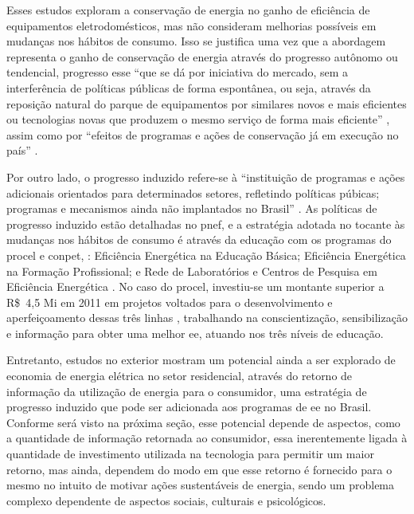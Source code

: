 Esses estudos exploram a conservação de energia no ganho de eficiência
de equipamentos eletrodomésticos, mas não consideram melhorias possíveis
em mudanças nos hábitos de consumo. Isso se justifica uma vez que a abordagem
representa o ganho de conservação de energia através do progresso autônomo
ou tendencial, progresso esse ``que se dá por iniciativa do mercado, sem a
interferência de políticas públicas de forma espontânea, ou seja, através da
reposição natural do parque de equipamentos por similares novos e mais
eficientes ou tecnologias novas que produzem o mesmo serviço de forma mais
eficiente'' \cite[pp. 1]{pnef}, assim como por ``efeitos de programas e ações de
conservação já em execução no país'' \cite[pp. 247]{pde_2020}.

Por outro lado, o progresso induzido refere-se à ``instituição de programas e ações
adicionais orientados para determinados setores, refletindo políticas púbicas;
programas e mecanismos ainda não implantados no Brasil'' \cite[pp. 247]{pde_2020}.
As políticas de progresso induzido estão detalhadas no \gls{pnef}, e a
estratégia adotada no tocante às mudanças nos hábitos de consumo é através da
educação com os programas do \gls{procel} e \gls{conpet}, : Eficiência Energética na Educação Básica; Eficiência
Energética na Formação Profissional; e Rede de Laboratórios e Centros de Pesquisa em Eficiência
Energética \cite[cap. 5]{pnef}. No caso do \gls{procel}, investiu-se um montante superior a
R\$~4,5 Mi em 2011 em projetos voltados para o desenvolvimento e
aperfeiçoamento dessas três linhas \cite{procel_resultados_2012}, trabalhando na
conscientização, sensibilização e informação para obter uma melhor \gls{ee},
atuando nos três níveis de educação.

Entretanto, estudos no exterior mostram um potencial ainda a ser explorado de
economia de energia elétrica no setor residencial, através do retorno de
informação da utilização de energia para o consumidor, uma estratégia de
progresso induzido que pode ser adicionada aos programas de \gls{ee} no Brasil.
Conforme será visto na próxima seção, esse potencial depende de aspectos, como a quantidade
de informação retornada ao consumidor, essa inerentemente ligada à quantidade de
investimento utilizada na tecnologia para permitir um maior retorno, mas ainda,
dependem do modo em que esse retorno é fornecido para o mesmo no intuito de
motivar ações sustentáveis de energia, sendo um problema complexo dependente de
aspectos sociais, culturais e psicológicos.

